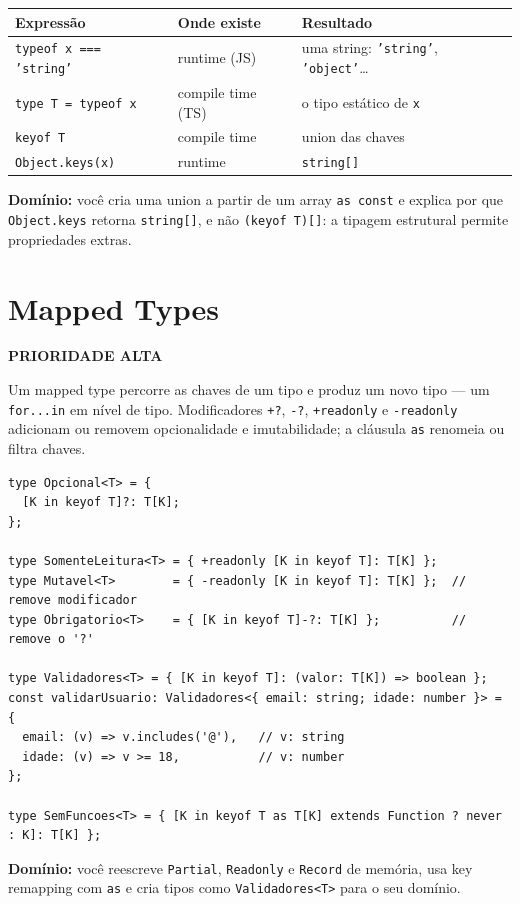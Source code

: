\documentclass[12pt,a4paper,oneside]{book}
\newcommand{\alta}{\colorbox{red!15}{\sffamily\scriptsize\bfseries PRIORIDADE ALTA}}
\newcommand{\code}[1]{\texttt{#1}}
\newcommand{\dom}[1]{\begin{dominio}\textbf{Domínio:} #1\end{dominio}}
\begin{document}
\begin{center}
\begin{tabular}{@{}lll@{}}
\toprule
\textbf{Expressão} & \textbf{Onde existe} & \textbf{Resultado} \\
\midrule
\code{typeof x === 'string'} & runtime (JS) & uma string: \code{'string'}, \code{'object'}\ldots \\
\code{type T = typeof x} & compile time (TS) & o tipo estático de \code{x} \\
\code{keyof T} & compile time & union das chaves \\
\code{Object.keys(x)} & runtime & \code{string[]} \\
\bottomrule
\end{tabular}
\end{center}

\dom{você cria uma union a partir de um array \code{as const} e explica por que \code{Object.keys} retorna \code{string[]}, e não \code{(keyof T)[]}: a tipagem estrutural permite propriedades extras.}

\section{Mapped Types}
\label{sec:mapped}
\alta

Um mapped type percorre as chaves de um tipo e produz um novo tipo --- um \code{for...in} em nível de tipo. Modificadores \code{+?}, \code{-?}, \code{+readonly} e \code{-readonly} adicionam ou removem opcionalidade e imutabilidade; a cláusula \code{as} renomeia ou filtra chaves.

\begin{verbatim}
type Opcional<T> = {
  [K in keyof T]?: T[K];
};

type SomenteLeitura<T> = { +readonly [K in keyof T]: T[K] };
type Mutavel<T>        = { -readonly [K in keyof T]: T[K] };  // remove modificador
type Obrigatorio<T>    = { [K in keyof T]-?: T[K] };          // remove o '?'

type Validadores<T> = { [K in keyof T]: (valor: T[K]) => boolean };
const validarUsuario: Validadores<{ email: string; idade: number }> = {
  email: (v) => v.includes('@'),   // v: string
  idade: (v) => v >= 18,           // v: number
};

type SemFuncoes<T> = { [K in keyof T as T[K] extends Function ? never : K]: T[K] };
\end{verbatim}

\dom{você reescreve \code{Partial}, \code{Readonly} e \code{Record} de memória, usa key remapping com \code{as} e cria tipos como \code{Validadores<T>} para o seu domínio.}
\end{document}
